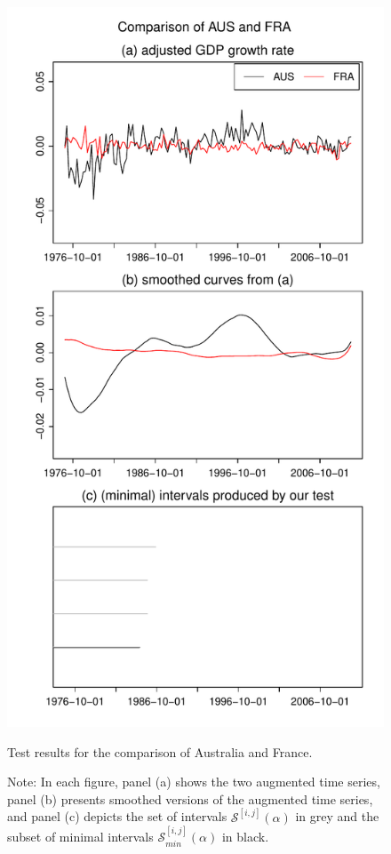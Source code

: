 \documentclass[12pt]{article}
\begin{document}
\begin{figure}
\begin{minipage}[t]{0.24\textwidth}
\includegraphics[width=\textwidth]{../output/plots/gdp/AUS_vs_FRA}
\caption{Test results for the comparison of Australia and France.}\label{fig:Australia:France}
\end{minipage}
\caption*{Note: In each figure, panel (a) shows the two augmented time series, panel (b) presents smoothed versions of the augmented time series, and panel (c) depicts the set of intervals $\mathcal{S}^{[i, j]}(\alpha)$ in grey and the subset of minimal intervals $\mathcal{S}^{[i, j]}_{min}(\alpha)$ in black.}
\end{figure}
\end{document}
